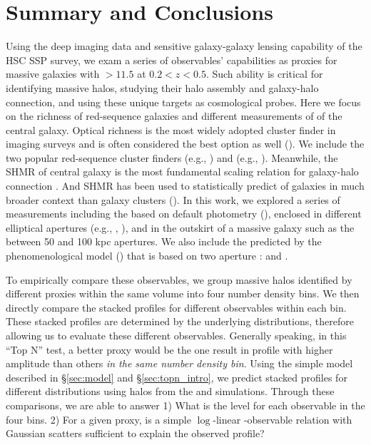 \documentclass[a4paper,fleqn,usenatbib]{mnras}
\begin{document}
\section{Summary and Conclusions}
    \label{sec:summary}

    Using the deep imaging data and sensitive galaxy-galaxy lensing capability of the HSC SSP
    survey, we exam a series of observables' capabilities as \mvir{} proxies for massive
    galaxies with \logms{}$>11.5$ at $0.2 < z < 0.5$.
    Such ability is critical for identifying massive halos, studying their halo assembly and
    galaxy-halo connection, and using these unique targets as cosmological probes.
    Here we focus on the richness of red-sequence galaxies and different measurements of \mstar{}
    of the central galaxy.
    Optical richness is the most widely adopted cluster finder in imaging surveys and is often
    considered the best option as well (\addref{}).
    We include the two popular red-sequence cluster finders \redm{} (e.g., \addref{}) and
    \camira{} (e.g., \addref{}).
    Meanwhile, the SHMR of central galaxy is the most fundamental scaling relation for
    galaxy-halo connection \citep[e.g.,][]{Wechsler2018}.
    And SHMR has been used to statistically predict \mvir{} of galaxies in much broader
    context than galaxy clusters (\addref{}).
    In this work, we explored a series of \mstar{} measurements including the \mstar{}
    based on default \cmodel{} photometry (\mcmodel{}), \mstar{} enclosed in different
    elliptical apertures (e.g., , ), and \mstar{} in the outskirt of a
    massive galaxy such as the \mstar{} between 50 and 100 kpc apertures.
    We also include the \mvir{} predicted by the phenomenological model \asap{}
    (\citealt{Huang2020}) that is based on two aperture \mstar{}:  and \mmax{}.

    To empirically compare these observables, we group massive halos identified by different
    proxies within the same volume into four number density bins.
    We then directly compare the stacked \dsigma{} profiles for different observables within
    each bin.
    These stacked \dsigma{} profiles are determined by the underlying \mvir{} distributions,
    therefore allowing us to evaluate these different observables.
    Generally speaking, in this ``Top N'' test, a better \mvir{} proxy would be the one result
    in \dsigma{} profile with higher amplitude than others \emph{in the same number density bin}.
    Using the simple model described in \S \ref{sec:model} and \S \ref{sec:topn_intro}, we
    predict stacked \dsigma{} profiles for different \mvir{} distributions using halos from
    the  and \smdpl{} simulations.
    Through these comparisons, we are able to answer
    1) What is the \sigmh{} level for each observable in the four bins.
    2) For a given \mvir{} proxy, is a simple $\log$-linear \mvir{}-observable relation with
    Gaussian scatters sufficient to explain the observed \dsigma{} profile?
\end{document}
